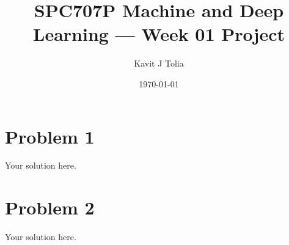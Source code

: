 \documentclass[11pt]{article}
\title{SPC707P Machine and Deep Learning — Week 01 Project}
\author{Kavit J Tolia}
\date{\today}
\begin{document}
\maketitle

\section{Problem 1}
Your solution here.

\section{Problem 2}
Your solution here.
\end{document}

